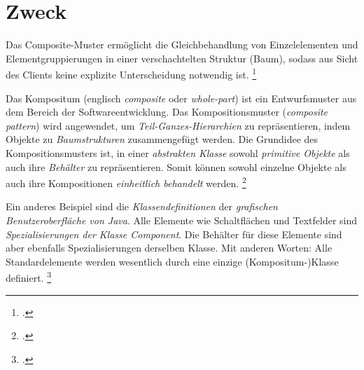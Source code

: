 \documentclass{bschlangaul-theorie}
\begin{document}
\section{Zweck}

Das Composite-Muster ermöglicht die Gleichbehandlung von Einzelelementen
und Elementgruppierungen in einer verschachtelten Struktur (\zB Baum),
sodass aus Sicht des Clients keine explizite Unterscheidung notwendig
ist.
\footcite[Seite 102]{eilebrecht}

%

Das Kompositum (englisch \emph{composite} oder \emph{whole-part}) ist
ein Entwurfsmuster aus dem Bereich der Softwareentwicklung. Das
Kompositionsmuster (\emph{composite pattern}) wird angewendet, um
\emph{Teil-Ganzes-Hierarchien} zu repräsentieren, indem Objekte zu
\emph{Baumstrukturen} zusammengefügt werden. Die Grundidee des
Kompositionsmusters ist, in einer \emph{abstrakten Klasse} sowohl
\emph{primitive Objekte} als auch ihre \emph{Behälter} zu
repräsentieren. Somit können sowohl einzelne Objekte als auch ihre
Kompositionen \emph{einheitlich behandelt} werden.
\footcite{aud:fs:4}

Ein anderes Beispiel sind die \emph{Klassendefinitionen} der
\emph{grafischen Benutzeroberfläche von Java}. Alle Elemente wie
Schaltflächen und Textfelder sind \emph{Spezialisierungen der Klasse
Component}. Die Behälter für diese Elemente sind aber ebenfalls
Spezialisierungen derselben Klasse. Mit anderen Worten: Alle
Standardelemente werden wesentlich durch eine einzige
(Kompositum-)Klasse definiert.
\footcite{wiki:kompositum}

\literatur
\end{document}
